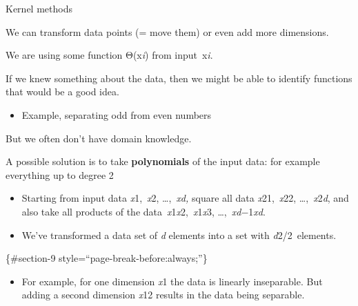 \documentclass[compress]{beamer}
\providecommand{\tightlist}{%
  \setlength{\itemsep}{0pt}\setlength{\parskip}{0pt}}
\begin{document}
\begin{frame}{Kernel methods}

We can transform data points (= move them) or even add more dimensions.

We are using some function Θ(x\emph{i}) from input~x\emph{i}.

If we knew something about the data, then we might be able to identify
functions that would be a good idea.

\begin{itemize}
\tightlist
\item
  Example, separating odd from even numbers
\end{itemize}

But we often don't have domain knowledge.

A possible solution is to take \textbf{polynomials} of the input data:
for example everything up to degree 2

\begin{itemize}
\tightlist
\item
  Starting from input data \emph{x}1,~\emph{x}2, \ldots{},~\emph{xd,}
  square all data \emph{x}21,~\emph{x}22, \ldots{},~\emph{x}2\emph{d},
  and also take all products of the
  data~\emph{x}1\emph{x}2,~\emph{x}1\emph{x}3,
  \ldots{},~\emph{xd}−1\emph{xd}.~
\item
  We've transformed a data set of \emph{d} elements into a set with
  \emph{d}2/2~elements.
\end{itemize}

\{\#section-9 style=``page-break-before:always;''\}

\begin{itemize}
\tightlist
\item
  For example, for one dimension \emph{x}1 the data is linearly
  inseparable. But adding a second dimension \emph{x}12 results in the
  data being separable.
\end{itemize}

\end{frame}
\end{document}
